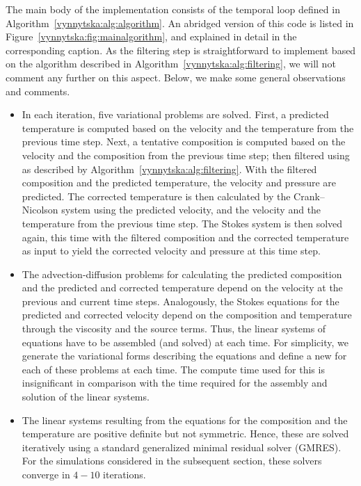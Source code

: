 The main body of the implementation consists of the temporal loop
defined in Algorithm~\ref{vynnytska:alg:algorithm}. An abridged version
of this code is listed in Figure~\ref{vynnytska:fig:mainalgorithm},
and explained in detail in the corresponding caption.  As the filtering
step is straightforward to implement based on the algorithm described in
Algorithm~\ref{vynnytska:alg:filtering}, we will not comment any further
on this aspect. Below, we make some general observations and comments.
\begin{itemize}
\item
  In each iteration, five variational problems are solved. First, a
  predicted temperature is computed based on the velocity and the
  temperature from the previous time step. Next, a tentative
  composition is computed based on the velocity and the composition
  from the previous time step; then filtered using as described by
  Algorithm~\ref{vynnytska:alg:filtering}. With the filtered
  composition and the predicted temperature, the velocity and pressure
  are predicted.  The corrected temperature is then calculated by the
  Crank--Nicolson system using the predicted velocity, and the
  velocity and the temperature from the previous time step. The Stokes
  system is then solved again, this time with the filtered composition
  and the corrected temperature as input to yield the corrected
  velocity and pressure at this time step.
\item
  The advection-diffusion problems for calculating the predicted
  composition and the predicted and corrected temperature depend on
  the velocity at the previous and current time steps. Analogously,
  the Stokes equations for the predicted and corrected velocity depend
  on the composition and temperature through the viscosity and the
  source terms. Thus, the linear systems of equations have to be
  assembled (and solved) at each time. For simplicity, we generate the
  variational forms describing the equations and define a
  new  for each of these problems at each
  time. The compute time used for this is insignificant in comparison
  with the time required for the assembly and solution of the linear
  systems.
\item
  The linear systems resulting from the equations for the composition
  and the temperature are positive definite but not symmetric. Hence,
  these are solved iteratively using a standard generalized minimal
  residual solver (GMRES). For the simulations considered in the
  subsequent section, these solvers converge in $4 - 10$ iterations.

\end{itemize}
